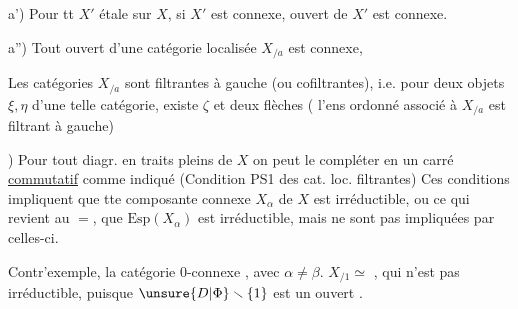 a') Pour tt $X'$ étale sur $X$, si $X'$ est connexe,  ouvert de $X'$ est connexe.

a'') Tout ouvert d'une catégorie localisée $X_{/a}$  est connexe, 


 Les catégories $X_{/a}$ sont  filtrantes  à gauche (ou  cofiltrantes), i.e. pour deux objets $\xi,\eta$ d'une telle catégorie, existe  $\zeta$ et deux flèches
\diagram{\begin{tikzcd}[ampersand replacement=\&,row sep=0pt,column sep=small]
 \& \xi\\ \zeta\arrow[ur]\arrow[dr] \& {}\\ \& \eta
\end{tikzcd}}
( l'ens ordonné  associé à $X_{/a}$ est filtrant à gauche)

) Pour  tout diagr. en traits pleins de $X$
on peut le compléter en un carré \uline{commutatif} comme indiqué (Condition PS1 des cat. loc. filtrantes)
Ces conditions impliquent que tte composante connexe $X_\alpha$ de $X$ est irréductible, ou ce qui revient au $=$, que $\mathrm{Esp}(X_\alpha)$ est irréductible,
mais ne sont pas impliquées par celles-ci.

Contr'exemple, la catégorie 0-connexe
, avec $\alpha\ne\beta$.   $X_{/1}\simeq$
, qui n'est pas irréductible, puisque $\unsure{D|\Phi}\smallsetminus\{1\}$  est un ouvert .

